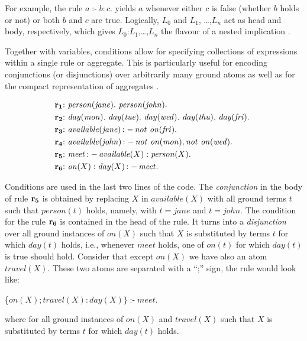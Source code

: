 \documentclass[a4paper, titlepage]{article}
\DeclareMathOperator{\leftimpl}{:-}
\DeclareMathOperator{\nott}{\mathit{not}}
\newcommand\mycenterline[1]{\par\smallskip\centerline{#1} \smallskip}
\newcommand{\row}[1]{%
  \ensuremath{\color{black}\ensuremath{\mathbf{#1}} \color{black}}%
}
\newcommand{\rowprefix}[1]{%
  \ensuremath{\color{black}\mathbf{#1{:}}\ }%
}
\begin{document}
For example, the rule $\mathit{a \leftimpl b : c.}$ yields 
$a$ whenever either $c$ is false (whether $b$ holds or not) 
or both $b$ and $c$ are true. Logically, $L_0$ and $L_1$,
\dots,$L_n$ act as head and body, respectively, which gives 
$L_0$:$L_1$,\dots,$L_n$ the flavour of a nested implication 
\cite{gkklorst2015}.

Together  with variables, conditions allow for specifying 
collections of expressions within a single rule or 
aggregate. This is particularly useful for encoding 
conjunctions (or disjunctions) over arbitrarily many ground 
atoms as well as for the compact representation of 
aggregates \cite{gkklorst2015}. 
\begin{exmp}
\begin{align*}
\rowprefix{r_1}& \mathit{person}(\mathit{jane}). \  \mathit{person}
(\mathit{john}).\\
\rowprefix{r_2}& \mathit{day}(\mathit{mon}). \ \mathit{day}
(\mathit{tue}). \ \mathit{day}(\mathit{wed}). \ \mathit{day}
(\mathit{thu}). \ \mathit{day}(\mathit{fri}). \ \\
\rowprefix{r_3}& \mathit{available}(\mathit{jane}) \leftimpl \nott \thinspace  
\mathit{on}(\mathit{fri}).\\
\rowprefix{r_4}& \mathit{available}(\mathit{john}) \leftimpl 
\nott \thinspace \mathit{on}(\mathit{mon}), \nott \thinspace \mathit{on}(\mathit{wed}).\\
\rowprefix{r_5}& \mathit{meet} \leftimpl \mathit{available}(X) : 
\mathit{person}(X).\\
\rowprefix{r_6}& \mathit{on}(X) : \mathit{day}(X) \leftimpl 
\mathit{meet}.
\end{align*}
\end{exmp}  
Conditions are used in the last two lines of the code. 
The \emph{conjunction} in the body of rule $\row{r_5}$ is obtained by 
replacing $X$ in $\mathit{available(X)}$ with all ground 
terms $t$ such that $\mathit{person(t)}$ holds, namely, 
with $\mathit{t=jane}$ and $\mathit{t=john}$. The condition 
for the rule $\row{r_6}$ is contained in the head of the rule. It 
turns into a \emph{disjunction} over all ground instances of 
$\mathit{on(X)}$ such that $X$ is substituted by terms $t$ 
for which $\mathit{day(t)}$ holds, i.e., whenever $\mathit{meet}$ holds, one of $\mathit{on(t)}$ for which $\mathit{day(t)}$ is true should hold. Consider that except $\mathit{on(X)}$ we have also an atom $\mathit{travel(X)}$. These two atoms are separated with a ``;'' sign, the rule would look like: \\
\mycenterline{\{$\mathit{on}(X);\mathit{travel}(X) : \mathit{day}(X)\} \leftimpl 
\mathit{meet}.$}
where for all ground instances of $\mathit{on(X)}$ and $\mathit{travel(X)}$ such that $X$ is substituted by terms $t$ for which $\mathit{day(t)}$ holds. 
\end{document}
